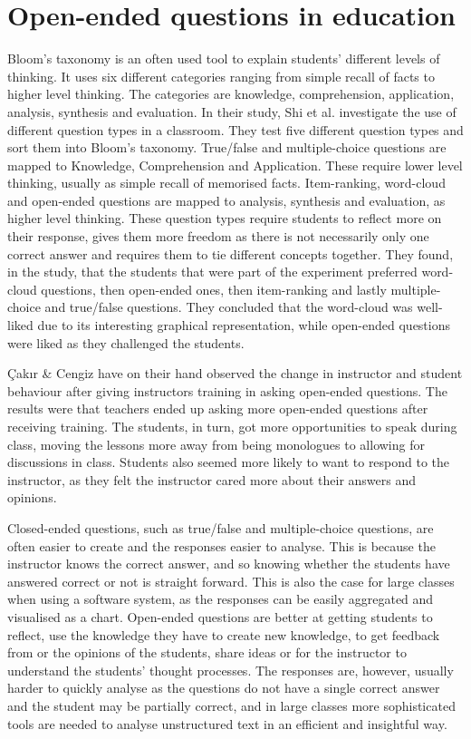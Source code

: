\section{Open-ended questions in education}
Bloom's taxonomy \cite{bloom1964taxonomy} is an often used tool to explain students' different levels of thinking. It uses six different categories ranging from simple recall of facts to higher level thinking. The categories are knowledge, comprehension, application, analysis, synthesis and evaluation. In their study, Shi et al. \cite{shi2023} investigate the use of different question types in a classroom. They test five different question types and sort them into Bloom's taxonomy. True/false and multiple-choice questions are mapped to Knowledge, Comprehension and Application. These require lower level thinking, usually as simple recall of memorised facts. Item-ranking, word-cloud and open-ended questions are mapped to analysis, synthesis and evaluation, as higher level thinking. These question types require students to reflect more on their response, gives them more freedom as there is not necessarily only one correct answer and requires them to tie different concepts together. They found, in the study, that the students that were part of the experiment preferred word-cloud questions, then open-ended ones, then item-ranking and lastly multiple-choice and true/false questions. They concluded that the word-cloud was well-liked due to its interesting graphical representation, while open-ended questions were liked as they challenged the students.

Çakır \& Cengiz \cite{openclosed2016} have on their hand observed the change in instructor and student behaviour after giving instructors training in asking open-ended questions. The results were that teachers ended up asking more open-ended questions after receiving training. The students, in turn, got more opportunities to speak during class, moving the lessons more away from being monologues to allowing for discussions in class. Students also seemed more likely to want to respond to the instructor, as they felt the instructor cared more about their answers and opinions. 

Closed-ended questions, such as true/false and multiple-choice questions, are often easier to create and the responses easier to analyse. This is because the instructor knows the correct answer, and so knowing whether the students have answered correct or not is straight forward. This is also the case for large classes when using a software system, as the responses can be easily aggregated and visualised as a chart. Open-ended questions are better at getting students to reflect, use the knowledge they have to create new knowledge, to get feedback from or the opinions of the students, share ideas or for the instructor to understand the students' thought processes. The responses are, however, usually harder to quickly analyse as the questions do not have a single correct answer and the student may be partially correct, and in large classes more sophisticated tools are needed to analyse unstructured text in an efficient and insightful way.


